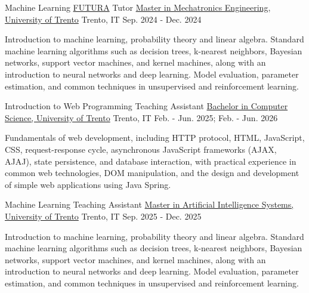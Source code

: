 \documentclass[11pt, a4paper]{awesome-cv}
\begin{document}
\begin{cventries}
  \cventry
    {Machine Learning \href{https://www.unitn.it/en/FUTURA}{FUTURA} Tutor} %
    {\href{https://unitn.coursecatalogue.cineca.it/insegnamenti/2024/50188_641129_95279/2021/50188/10752?coorte=2023&schemaid=8258}{Master in Mechatronics Engineering, University of Trento}} %
    {Trento, IT} %
    {Sep. 2024 - Dec. 2024} %
    {
      \begin{cvitems} %
        \item {Introduction to machine learning, probability theory and linear algebra. Standard machine learning algorithms such as decision trees, k-nearest neighbors, Bayesian networks, support vector machines, and kernel machines, along with an introduction to neural networks and deep learning. Model evaluation, parameter estimation, and common techniques in unsupervised and reinforcement learning.}
      \end{cvitems}
    }

  \cventry
    {Introduction to Web Programming Teaching Assistant} %
    {\href{https://unitn.coursecatalogue.cineca.it/insegnamenti/2024/50194_640745_90646/2008/50195/10114?coorte=2023&schemaid=9078}{Bachelor in Computer Science, University of Trento}} %
    {Trento, IT} %
    {Feb. - Jun. 2025; Feb. - Jun. 2026} %
    {
      \begin{cvitems} %
        \item {Fundamentals of web development, including HTTP protocol, HTML, JavaScript, CSS, request-response cycle, asynchronous JavaScript frameworks (AJAX, AJAJ), state persistence, and database interaction, with practical experience in common web technologies, DOM manipulation, and the design and development of simple web applications using Java Spring.}
      \end{cvitems}
    }

    \cventry
    {Machine Learning Teaching Assistant} %
    {\href{https://unitn.coursecatalogue.cineca.it/insegnamenti/2025/50868_650944_94663/2025/50869/10884?coorte=2025&schemaid=9097}{Master in Artificial Intelligence Systems, University of Trento}} %
    {Trento, IT} %
    {Sep. 2025 - Dec. 2025} %
    {
      \begin{cvitems} %
        \item {Introduction to machine learning, probability theory and linear algebra. Standard machine learning algorithms such as decision trees, k-nearest neighbors, Bayesian networks, support vector machines, and kernel machines, along with an introduction to neural networks and deep learning. Model evaluation, parameter estimation, and common techniques in unsupervised and reinforcement learning.}
      \end{cvitems}
    }

\end{cventries}
\end{document}
